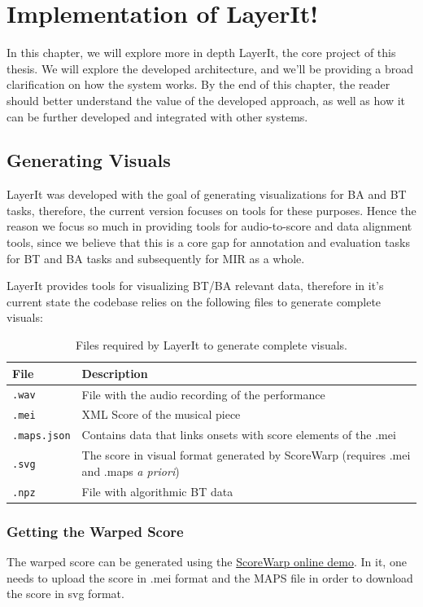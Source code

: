 \chapter{Implementation of LayerIt!}\label{chap:chap4}
In this chapter, we will explore more in depth LayerIt, the core project of this thesis. We will explore the developed architecture, and we'll be providing a broad clarification on how the system works. By the end of this chapter, the reader should better understand the value of the developed approach, as well as how it can be further developed and integrated with other systems. 

\section{Generating Visuals}
LayerIt was developed with the goal of generating visualizations for BA and BT tasks, therefore, the current version focuses on tools for these purposes. Hence the reason we focus so much in providing tools for audio-to-score and data alignment tools, since we believe that this is a core gap for annotation and evaluation tasks for BT and BA tasks and subsequently for MIR as a whole.

LayerIt provides tools for visualizing BT/BA relevant data, therefore in it's current state the codebase relies on the following files to generate complete visuals:

\begin{table}[h]
\centering
\begin{tabular}{p{} p{}}
\hline
\textbf{File} & \textbf{Description} \\
\hline
\texttt{.wav} &  File with the audio recording of the performance \\
\texttt{.mei} &  XML Score of the musical piece\\
\texttt{.maps.json} &  Contains data that links onsets with score elements of the .mei\\
\texttt{.svg} &  The score in visual format generated by ScoreWarp (requires .mei and .maps \textit{a priori})\\
\texttt{.npz} &  File with algorithmic BT data\\
\hline
\end{tabular}
\caption[Required files for LayerIt]{Files required by LayerIt to generate complete visuals.}
\label{tab:required-files}
\end{table} 

\subsection{Getting the Warped Score}
The warped score can be generated using the \href{https://iwk-digital.github.io/scorewarp/}{ScoreWarp online demo}.  In it, one needs to upload the score in .mei format and the MAPS file in order to download the score in svg format. 

